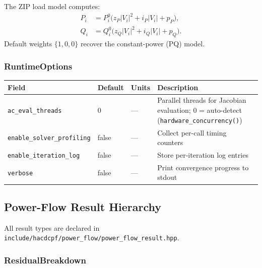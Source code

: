 The ZIP load model computes:
\begin{align}
P_i &= P_i^0 \bigl(z_P |V_i|^2 + i_P |V_i| + p_P\bigr), \\
Q_i &= Q_i^0 \bigl(z_Q |V_i|^2 + i_Q |V_i| + p_Q\bigr).
\end{align}
Default weights $\{1, 0, 0\}$ recover the constant-power (PQ) model.

\subsubsection{RuntimeOptions}
\begin{center}
\begin{tabular}{llll}
\hline\hline
\textbf{Field} & \textbf{Default} & \textbf{Units} & \textbf{Description} \\
\hline
\texttt{ac\_eval\_threads} & 0 & --- & Parallel threads for Jacobian evaluation; 0 = auto-detect (\texttt{hardware\_concurrency()}) \\
\texttt{enable\_solver\_profiling} & false & --- & Collect per-call timing counters \\
\texttt{enable\_iteration\_log} & false & --- & Store per-iteration log entries \\
\texttt{verbose} & false & --- & Print convergence progress to stdout \\
\hline\hline
\end{tabular}
\end{center}

\subsection{Power-Flow Result Hierarchy}
\label{sec:pf-results}

All result types are declared in
\texttt{include/hacdcpf/power\_flow/power\_flow\_result.hpp}.

\subsubsection{ResidualBreakdown}

